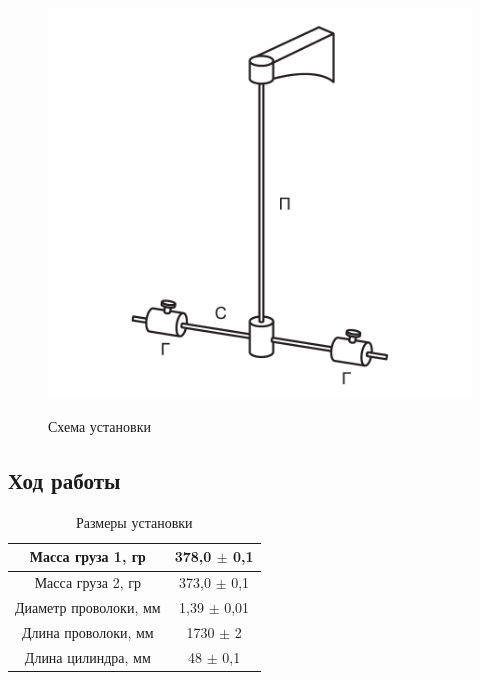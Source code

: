 \documentclass[a4paper, 12pt]{article}
\begin{document}
\begin{figure}[H]
    \begin{center}
        \includegraphics[scale=0.3]{ust2.png}
        \begin{center}
        \caption{Схема установки}
        \end{center}
        \label{graphic1b}
    \end{center}
\end{figure}

\begin{center}
    \subsection*{Ход работы}
\end{center}

\begin{table}[h!]
    \begin{center}
        \begin{tabular}{|c|c|}
        \hline
        Масса груза 1, гр     & 378,0 $\pm$ 0,1 \\ \hline
        Масса груза 2, гр     & 373,0 $\pm$ 0,1 \\ \hline
        Диаметр проволоки, мм & 1,39 $\pm$ 0,01 \\ \hline
        Длина проволоки, мм   & 1730 $\pm$ 2    \\ \hline
        Длина цилиндра, мм    & 48 $\pm$ 0,1    \\ \hline
        \end{tabular}
        \caption{Размеры установки}
    \end{center}
\end{table}
\end{document}

